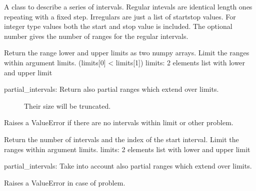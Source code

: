 \documentclass[letterpaper,10pt,english]{sphinxmanual}
\begin{document}
\begin{fulllineitems}
\label{\detokenize{coordinate:flap.coordinate.Intervals}}
A class to describe a series of intervals.
Regular intevals are identical length ones repeating with a fixed step.
Irregulars are just a list of start\sphinxhyphen{}stop values.
For integer type values both the start and stop value is included.
The optional number gives the number of ranges for the regular intervals.

\begin{fulllineitems}
\label{\detokenize{coordinate:flap.coordinate.Intervals.interval_limits}}
Return the range lower and upper limits as two numpy arrays.
Limit the ranges within argument limits. (limits{[}0{]} \textless{} limits{[}1{]})
limits: 2 elements list with lower and upper limit
\begin{description}
\item[{partial\_intervals: Return also partial ranges which extend over limits.}] \leavevmode
Their size will be truncated.

\end{description}

Raises a ValueError if there are no intervals within  limit or other problem.

\end{fulllineitems}


\begin{fulllineitems}
\label{\detokenize{coordinate:flap.coordinate.Intervals.interval_number}}
Return the number of intervals and the index of the start interval.
Limit the ranges within argument limits.
limits: 2 elements list with lower and upper limit

partial\_intervals: Take into account also partial ranges which extend over limits.

Raises a ValueError in case of problem.

\end{fulllineitems}


\end{fulllineitems}
\end{document}
